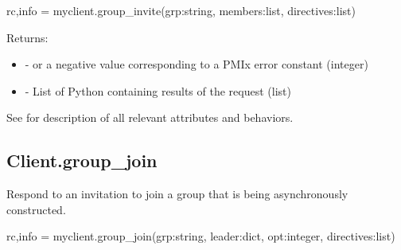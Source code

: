 \pyspecificstart
\begin{codepar}
rc,info = myclient.group_invite(grp:string,
                        members:list, directives:list)
\end{codepar}
\pyspecificend

\begin{arglist}
\end{arglist}

Returns:

\begin{itemize}
    \item {} -  or a negative value corresponding to a PMIx error constant (integer)
    \item {} - List of Python  containing results of the request (list)
\end{itemize}

See  for description of all relevant attributes and behaviors.


\subsection{Client.group_join}

\summary

Respond to an invitation to join a group that is being asynchronously constructed.

\format

\pyspecificstart
\begin{codepar}
rc,info = myclient.group_join(grp:string,
                        leader:dict, opt:integer,
                        directives:list)
\end{codepar}
\pyspecificend

\begin{arglist}
\end{arglist}

